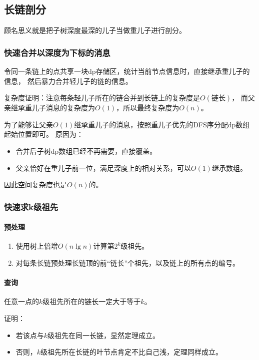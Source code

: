 \subsection{长链剖分}

顾名思义就是把子树深度最深的儿子当做重儿子进行剖分。

\subsubsection{快速合并以深度为下标的消息}
令同一条链上的点共享一块dp存储区，统计当前节点信息时，直接继承重儿子的信息，
然后暴力合并轻儿子的链的信息。

复杂度证明：注意每条轻儿子所在的链合并到长链上的复杂度是$O(链长)$，
而父亲继承重儿子消息的复杂度为$O(1)$，所以最终复杂度为$O(n)$。

为了能够让父亲$O(1)$继承重儿子的消息，按照重儿子优先的DFS序分配dp数组起始位置即可。
原因为：
\begin{itemize}
    \item 合并后子树dp数组已经不再需要，直接覆盖。
    \item 父亲恰好在重儿子前一位，满足深度上的相对关系，可以$O(1)$继承数组。
\end{itemize}
因此空间复杂度也是$O(n)$的。

\subsubsection{快速求k级祖先}
\paragraph{预处理}
\begin{enumerate}
    \item 使用树上倍增$O(n\lg n)$计算第$2^k$级祖先。
    \item 对每条长链预处理长链顶的前``链长''个祖先，以及链上的所有点的编号。
\end{enumerate}

\paragraph{查询}

\begin{theorem}\label{DBCBD}
    任意一点的$k$级祖先所在的链长一定大于等于$k$。
\end{theorem}
证明：
\begin{itemize}
    \item 若该点与$k$级祖先在同一长链，显然定理成立。
    \item 否则，$k$级祖先所在长链的叶节点肯定不比自己浅，定理同样成立。
\end{itemize}

